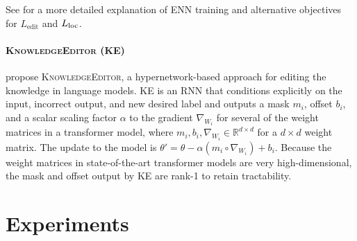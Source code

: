 \documentclass{article}
\begin{document}
See \citet{Sinitsin2020Editable} for a more detailed explanation of ENN training and alternative objectives for $ L_\text{edit}$ and $ L_\text{loc}$.

\paragraph{\textsc{KnowledgeEditor} (KE)}
\cite{Cao2021EditingFK} propose \textsc{KnowledgeEditor}, a hypernetwork-based approach for editing the knowledge in language models. KE is an RNN that conditions explicitly on the input, incorrect output, and new desired label and outputs a mask $m_i$, offset $b_i$, and a scalar scaling factor $\alpha$ to the gradient $\nabla_{W_i}$ for several of the weight matrices in a transformer model, where $m_i,b_i,\nabla_{W_i} \in \mathbb{R}^{d \times d}$ for a $d \times d$ weight matrix. The update to the model is $\theta' = \theta - \alpha (m_i \circ \nabla_{W_i}) + b_i$. Because the weight matrices in state-of-the-art transformer models are very high-dimensional, the mask and offset output by KE are rank-1 to retain tractability.

\section{Experiments}

\end{document}

